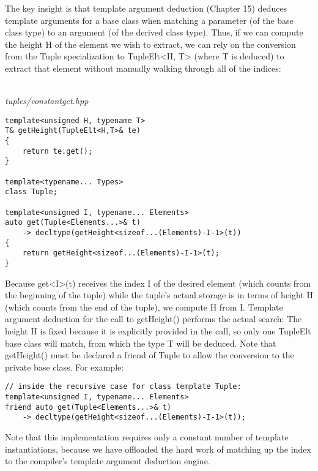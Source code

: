 The key insight is that template argument deduction (Chapter 15) deduces template arguments for a base class when matching a parameter (of the base class type) to an argument (of the derived class type). Thus, if we can compute the height H of the element we wish to extract, we can rely on the conversion from the Tuple specialization to TupleElt<H, T> (where T is deduced) to extract that element without manually walking through all of the indices:

\hspace*{\fill} \\ %
\noindent
\textit{tuples/constantget.hpp}
\begin{lstlisting}[style=styleCXX]
template<unsigned H, typename T>
T& getHeight(TupleElt<H,T>& te)
{
	return te.get();
}

template<typename... Types>
class Tuple;

template<unsigned I, typename... Elements>
auto get(Tuple<Elements...>& t)
	-> decltype(getHeight<sizeof...(Elements)-I-1>(t))
{
	return getHeight<sizeof...(Elements)-I-1>(t);
}
\end{lstlisting}

Because get<I>(t) receives the index I of the desired element (which counts from the beginning of the tuple) while the tuple’s actual storage is in terms of height H (which counts from the end of the tuple), we compute H from I. Template argument deduction for the call to getHeight() performs the actual search: The height H is fixed because it is explicitly provided in the call, so only one TupleElt base class will match, from which the type T will be deduced. Note that getHeight() must be declared a friend of Tuple to allow the conversion to the private base class. For example:

\begin{lstlisting}[style=styleCXX]
// inside the recursive case for class template Tuple:
template<unsigned I, typename... Elements>
friend auto get(Tuple<Elements...>& t)
	-> decltype(getHeight<sizeof...(Elements)-I-1>(t));
\end{lstlisting}

Note that this implementation requires only a constant number of template instantiations, because we have offloaded the hard work of matching up the index to the compiler’s template argument deduction engine.









